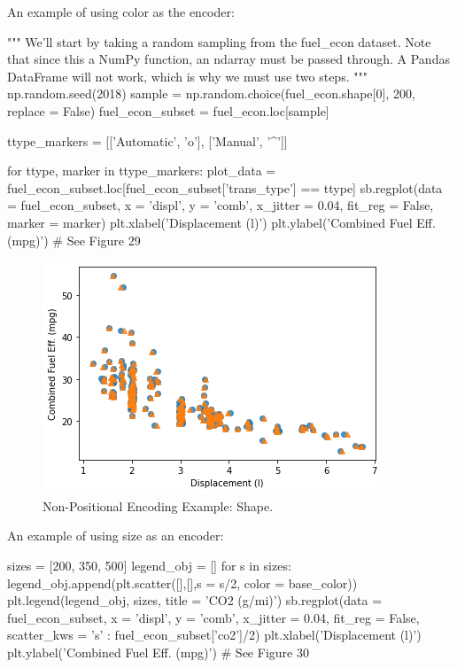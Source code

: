 An example of using color as the encoder:
\begin{python}
	"""
	We'll start by taking a random sampling from the fuel_econ dataset. Note that since this a NumPy function, an ndarray must be passed through. A Pandas DataFrame will not work, which is why we must use two steps.
	"""
	np.random.seed(2018)
	sample = np.random.choice(fuel_econ.shape[0], 200, replace = False)
	fuel_econ_subset = fuel_econ.loc[sample]
	
	ttype_markers = [['Automatic', 'o'], ['Manual', '^']]
	
	for ttype, marker in ttype_markers:
		plot_data = fuel_econ_subset.loc[fuel_econ_subset['trans_type'] == ttype]
		sb.regplot(data = fuel_econ_subset, x = 'displ', y = 'comb', x_jitter = 0.04, fit_reg = False, marker = marker)
	plt.xlabel('Displacement (l)')
	plt.ylabel('Combined Fuel Eff. (mpg)')
	# See Figure 29
\end{python}

\begin{figure}
	\includegraphics{images/figure29.png}
	\caption{Non-Positional Encoding Example: Shape.}\label{fig:figure29}
\end{figure}

An example of using size as an encoder:

\begin{python}
	sizes = [200, 350, 500]
	legend_obj = []
	for s in sizes:
		legend_obj.append(plt.scatter([],[],s = s/2, color = base_color))
	plt.legend(legend_obj, sizes, title = 'CO2 (g/mi)')
	sb.regplot(data = fuel_econ_subset, x = 'displ', y = 'comb', x_jitter = 0.04, fit_reg = False, scatter_kws = {'s' : fuel_econ_subset['co2']/2})
	plt.xlabel('Displacement (l)')
	plt.ylabel('Combined Fuel Eff. (mpg)')
	# See Figure 30
\end{python}

